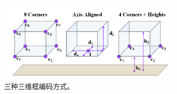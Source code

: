 \begin{figure}
	\centering
	\includegraphics[width=0.8\textwidth]{imgs/box-encoding.png}
	\caption{三种三维框编码方式。}
	\label{fig:box_encoding}
\end{figure}
